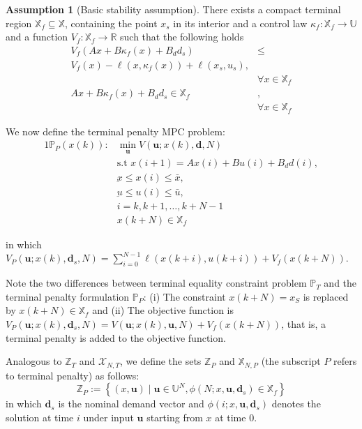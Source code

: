 \documentclass[10pt]{article}
\newcommand{\bu}{\mathbf{u}}
\newcommand{\bd}{\mathbf{d}}
\newcommand{\set}[1]{\left\lbrace #1 \right\rbrace}
\theoremstyle{definition}
\newtheorem{assumption}[theorem]{Assumption}
\begin{document}
\begin{assumption}[Basic stability assumption]
\label{ass:BSA}
There exists a compact terminal region $\mathbb{X}_f \subseteq
\mathbb{X}$, containing the point $x_s$ in its interior and a control
law $\kappa_f: \mathbb{X}_f \rightarrow \mathbb{U}$  and a function
$V_f:\mathbb{X}_f \rightarrow \mathbb{R}$ such that the
following holds
\begin{align}
\label{eq:BSA}
V_f(Ax+B\kappa_f(x)+B_dd_s) &\leq \nonumber\\
V_f(x)-\ell(x,\kappa_f(x))+\ell(x_s,u_s),& \\
&\forall x \in \mathbb{X}_f \nonumber \\
\label{eq:invariant}
Ax+ B\kappa_f(x) +B_dd_s \in \mathbb{X}_f&, \\ & \forall x \in
\mathbb{X}_f \nonumber
\end{align}
\end{assumption}

We now define the terminal penalty MPC problem:
\begin{alignat}{1}
\label{eq:PP}
\mathbb{P}_P(x(k)):& \min_{\bu}{V(\bu;x(k),\bd,N)} \nonumber \\
&\text{s.t~} x(i+1) = Ax(i) + Bu(i)+B_dd(i), \nonumber\\
&\underbar{x} \leq x(i) \leq \bar{x},  \\
&\underbar{u} \leq u(i) \leq \bar{u}, \nonumber \\
&i = k,k+1,\ldots,k+N-1\nonumber\\
&x(k+N) \in \mathbb{X}_f \nonumber
\end{alignat}

in which $V_P(\bu;x(k),\bd_s,N) = \sum_{i=0}^{N-1}
\ell(x(k+i),u(k+i))+ V_f(x(k+N))$.

Note the two differences between terminal equality constraint problem
$\mathbb{P}_T$ and the terminal penalty formulation $\mathbb{P}_P$:
(i) The constraint $x(k+N) = x_S$ is replaced by $x(k+N) \in
\mathbb{X}_f$ and (ii) The objective function is $V_P(\bu;x(k),\bd_s,N) =
V(\bu;x(k),\bu,N) + V_f(x(k+N))$, that is, a terminal penalty is added
to the objective function. 

Analogous to $\mathbb{Z}_T$ and $\mathcal{X}_{N,T}$, we define the
sets $\mathbb{Z}_P$ and $\mathbb{X}_{N,P}$ (the subscript $P$ refers
to terminal penalty) as follows:
\[ \mathbb{Z}_P := \set{(x,\bu) \mid  \bu \in \mathbb{U}^N,
  \phi(N;x,\bu,\bd_s) \in \mathbb{X}_f}\]
in which $\bd_s$ is the nominal demand vector and
$\phi(i;x,\bu,\bd_s)$ denotes the solution at time $i$ under input
$\bu$ starting from $x$ at time $0$. 
\end{document}
